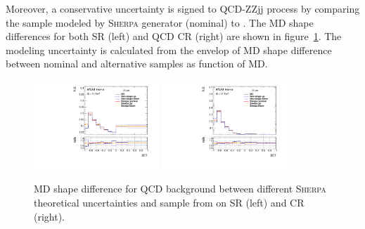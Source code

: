 Moreover, a conservative uncertainty is signed to QCD-ZZjj process by comparing the sample modeled by \textsc{Sherpa} generator (nominal) to \MGMCatNLO.
The MD shape differences for both SR (left) and QCD CR (right) are shown in figure~\ref{fig:sys_exp_shmg}.
The modeling uncertainty is calculated from the envelop of MD shape difference between nominal and alternative samples as function of MD.
\begin{figure}
  \centering
  \includegraphics[width=0.42\textwidth]{figures/VBSZZ/syst/BDT_shape_nor_linear_SR.pdf}
  \includegraphics[width=0.42\textwidth]{figures/VBSZZ/syst/BDT_shape_nor_linear_CR.pdf}
  \caption{MD shape difference for QCD \qqZZ background between different \textsc{Sherpa} theoretical uncertainties and sample from \MGMCatNLO on SR (left) and CR (right).}
  \label{fig:sys_exp_shmg}
\end{figure}

